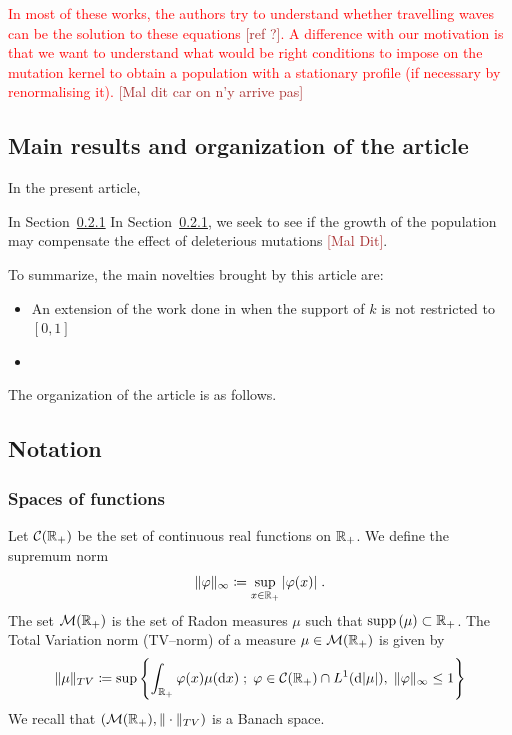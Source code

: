 \documentclass[11pt]{amsart}
\newcommand{\dd}{\mathrm{d}}
\newcommand{\ndr}[1]{\textcolor{brown}{[#1]}}
\newcommand{\guim}[1]{\textcolor{red}{#1}}
\newcommand{\supp}{\mathrm{supp}\,}
\begin{document}
\guim{
In most of these works, the authors try to understand whether travelling waves can be the solution to these equations \ndr{ref ?}. A difference with our motivation is that we want to understand what would be right conditions to impose on the mutation kernel to obtain a population with a stationary profile (if necessary by renormalising it).} \ndr{Mal dit car on n'y arrive pas}\\

\subsection{Main results and organization of the article} \mbox{}

In the present article, 

In Section~\ref{}
In Section~\ref{}, we seek to see if the growth of the population may compensate the effect of deleterious mutations \ndr{Mal Dit}. 

To summarize, the main novelties brought by this article are: 
\begin{itemize}
    \item An extension of the work done in \cite{doumic2016time} when the support of $k$ is not restricted to $[0,1]$
    \item 
\end{itemize}

The organization of the article is as follows.

\subsection{Notation}

\subsubsection{Spaces of functions}

Let $\mathcal{C}(\mathbb{R}_+)$ be the set of continuous real functions on $\mathbb{R}_+$. We define the supremum norm
\begin{equation*}
    \|\varphi\|_{\infty} \coloneqq\sup_{x \in \mathbb{R}_+} |\varphi(x)| 
    \; .
\end{equation*}
The set $\mathcal{M}(\mathbb{R}_+)$ is the set of Radon measures $\mu$ such that $\supp(\mu) \subset \RR_+$. The Total Variation norm (TV--norm) of a measure $\mu \in \mathcal{M}(\mathbb{R}_+)$ is given by 
    \begin{equation*}
        \|\mu\|_{TV} \coloneqq\sup \left\{ \int_{\RR_+} \varphi(x) \mu(\dd x)\; ; \; \varphi \in \Ccal(\RR_+)\cap L^1(\dd|\mu|),\; \|\varphi\|_{\infty} \leq 1\right\}
    \end{equation*}
We recall that $\left(\mathcal{M}(\mathbb{R}_+), \|\cdot\|_{TV}\right)$ is a Banach space. 
\end{document}
